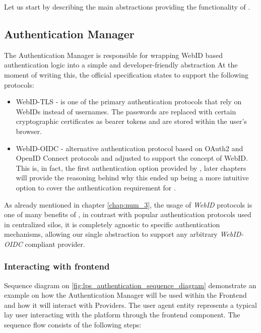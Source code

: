 Let us start by describing the main abstractions providing the functionality of \lpas{}.

\subsection{Authentication Manager}
\label{sssec:authentication_manager}

The Authentication Manager is responsible for wrapping \solid{} WebID based authentication logic into a simple and developer-friendly abstraction At the moment of writing this, the official \solid{} specification states to support the following protocols:
\begin{itemize}
\item WebID-TLS  - is one of the primary authentication protocols that rely on WebIDs instead of usernames. The passwords are replaced with certain cryptographic certificates as bearer tokens and are stored within the user's browser.
\item WebID-OIDC - alternative authentication protocol based on OAuth2 and OpenID Connect protocols and adjusted to support the concept of WebID. This is, in fact, the first authentication option provided by \lpas{}, later chapters will provide the reasoning behind why this ended up being a more intuitive option to cover the authentication requirement for \lpa{}.   
\end{itemize}

As already mentioned in chapter \ref{chap:num_3}, the usage of \textit{WebID} protocols is one of many benefits of \solid{}, in contrast with popular authentication protocols used in centralized silos, it is completely agnostic to specific authentication mechanisms, allowing our single abstraction to support any arbitrary \textit{WebID-OIDC} compliant \solid{} provider. 

\subsubsection{Interacting with frontend}

Sequence diagram on \autoref{fig:lps_authentication_sequence_diagram} demonstrate an example on how the Authentication Manager will be used within the \lpa{} Frontend and how it will interact with \solid{} Providers. The user agent entity represents a typical lay \lpa{} user interacting with the platform through the frontend component. The sequence flow consists of the following steps:

